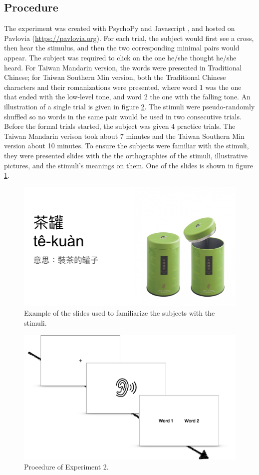 \documentclass[12pt]{report}
\begin{document}
\begin{CJK}{UTF8}{bsmi}
\subsection{Procedure}
The experiment was created with PsychoPy \citep{Peirce2019} and Javascript \citep{Flanagan2006}, and hosted on Pavlovia (\url{https://pavlovia.org}). For each trial, the subject would first see a cross, then hear the stimulus, and then the two corresponding minimal pairs would appear. The subject was required to click on the one he/she thought he/she heard. For Taiwan Mandarin version, the words were presented in Traditional Chinese; for Taiwan Southern Min version, both the Traditional Chinese characters and their romanizations were presented, where word 1 was the one that ended with the low-level tone, and word 2 the one with the falling tone. An illustration of a single trial is given in figure  \ref{Figure:Experiment2Procedure}. The stimuli were pseudo-randomly shuffled so no words in the same pair would be used in two consecutive trials. Before the formal trials started, the subject was given 4 practice trials. The Taiwan Mandarin verison took about 7 minutes and the Taiwan Southern Min version about 10 minutes. To ensure the subjects were familiar with the stimuli, they were presented slides with the the orthographies of the stimuli, illustrative pictures, and the stimuli's meanings on them. One of the slides is shown in figure \ref{Figure:Experiment2SlideExample}.

\begin{figure}[h]
\centering
\includegraphics[width=.7\textwidth]{Figures/E2/SlideExample.jpg}
\caption{Example of the slides used to familiarize the subjects with the stimuli.}
\label{Figure:Experiment2SlideExample}
\end{figure}


\begin{figure}[h]
\centering
\includegraphics[width=.7\textwidth]{Figures/E2/Procedure.png}
\caption{Procedure of Experiment 2.}
\label{Figure:Experiment2Procedure}
\end{figure}


\end{CJK}
\end{document}
